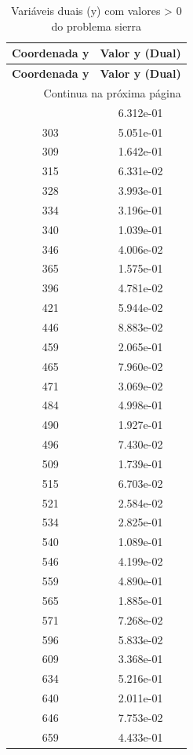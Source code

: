 \documentclass[12pt]{article}
\begin{document}
\begin{longtable}{@{}cc@{}}
\caption{Variáveis duais (y) com valores > 0 do problema sierra} \\
\toprule
\textbf{Coordenada y} & \textbf{Valor y (Dual)} \\
\midrule
\endfirsthead

\toprule
\textbf{Coordenada y} & \textbf{Valor y (Dual)} \\
\midrule
\endhead

\midrule \multicolumn{2}{r}{{Continua na próxima página}} \\ \midrule
\endfoot

\bottomrule
\endlastfoot
297 & 6.312e-01 \\
303 & 5.051e-01 \\
309 & 1.642e-01 \\
315 & 6.331e-02 \\
328 & 3.993e-01 \\
334 & 3.196e-01 \\
340 & 1.039e-01 \\
346 & 4.006e-02 \\
365 & 1.575e-01 \\
396 & 4.781e-02 \\
421 & 5.944e-02 \\
446 & 8.883e-02 \\
459 & 2.065e-01 \\
465 & 7.960e-02 \\
471 & 3.069e-02 \\
484 & 4.998e-01 \\
490 & 1.927e-01 \\
496 & 7.430e-02 \\
509 & 1.739e-01 \\
515 & 6.703e-02 \\
521 & 2.584e-02 \\
534 & 2.825e-01 \\
540 & 1.089e-01 \\
546 & 4.199e-02 \\
559 & 4.890e-01 \\
565 & 1.885e-01 \\
571 & 7.268e-02 \\
596 & 5.833e-02 \\
609 & 3.368e-01 \\
634 & 5.216e-01 \\
640 & 2.011e-01 \\
646 & 7.753e-02 \\
659 & 4.433e-01 \\

\end{longtable}
\end{document}
